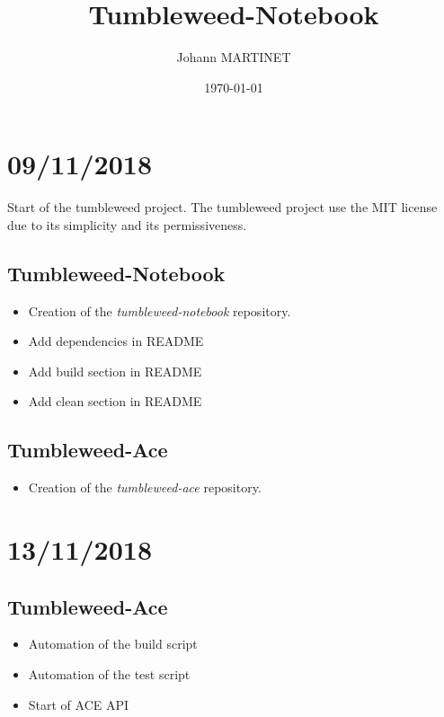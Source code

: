

\title{Tumbleweed-Notebook}
\author{Johann MARTINET}
\date{\today}


\maketitle

\section*{09/11/2018}%
\label{sec:09_11_2018}

Start of the tumbleweed project.
The tumbleweed project use the MIT license due to its simplicity and its permissiveness.

\subsection*{Tumbleweed-Notebook}%
\begin{itemize}
        \item Creation of the \emph{tumbleweed-notebook} repository.
        \item Add dependencies in README
        \item Add build section in README
        \item Add clean section in README
\end{itemize}

\subsection*{Tumbleweed-Ace}%
\begin{itemize}
        \item Creation of the \emph{tumbleweed-ace} repository.
\end{itemize}

\section*{13/11/2018}%
\label{sec:13_11_2018}

\subsection*{Tumbleweed-Ace}%
\begin{itemize}
        \item Automation of the build script
        \item Automation of the test script
        \item Start of ACE API
\end{itemize}


